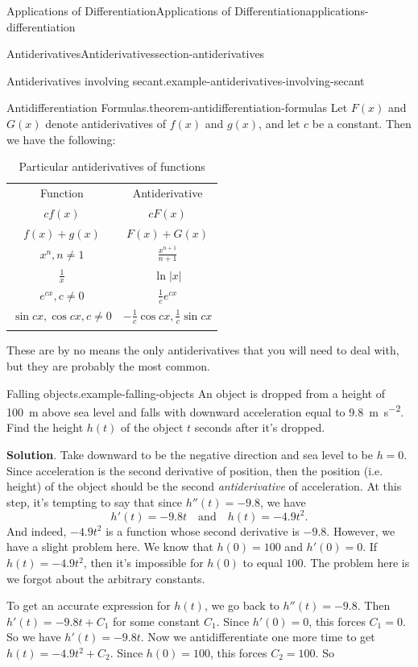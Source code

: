 \documentclass[oneside,10pt,]{book}
\numberwithin{equation}{section}
\newcommand{\hrulethin}  {\noalign{\hrule height 0.04em}}
\newcommand{\hrulethick} {\noalign{\hrule height 0.11em}}
\begin{document}
\begin{chapterptx}{Applications of Differentiation}{}{Applications of Differentiation}{}{}{applications-differentiation}
\begin{sectionptx}{Antiderivatives}{}{Antiderivatives}{}{}{section-antiderivatives}
\begin{example}{Antiderivatives involving secant.}{example-antiderivatives-involving-secant}
\end{example}
\begin{theorem}{Antidifferentiation Formulas.}{}{theorem-antidifferentiation-formulas}%
\hypertarget{p-392}{}%
Let \(F(x)\) and \(G(x)\) denote antiderivatives of \(f(x)\) and \(g(x)\), and let \(c\) be a constant. Then we have the following: \begin{table}
\centering
\begin{tabular}{cc}\hrulethick
Function&Antiderivative\tabularnewline\hrulethin
\(cf(x)\)&\(cF(x)\)\tabularnewline[0pt]
\(f(x) + g(x)\)&\(F(x) + G(x)\)\tabularnewline[0pt]
\(x^{n}, n\neq1\)&\(\frac{x^{n+1}}{n+1}\)\tabularnewline[0pt]
\(\frac{1}{x}\)&\(\ln|x|\)\tabularnewline[0pt]
\(e^{cx}, c\neq0\)&\(\frac{1}{c}e^{cx}\)\tabularnewline[0pt]
\(\sin cx, \cos cx, c\neq 0\)&\(-\frac{1}{c}\cos cx, \frac{1}{c}\sin cx\)\tabularnewline\hrulethick
\end{tabular}
\caption{Particular antiderivatives of functions\label{table-antiderivatives}}
\end{table}
 These are by no means the only antiderivatives that you will need to deal with, but they are probably the most common.%
\end{theorem}
\begin{example}{Falling objects.}{example-falling-objects}%
\hypertarget{p-393}{}%
An object is dropped from a height of \SI{100}{\meter} above sea level and falls with downward acceleration equal to \SI{9.8}{\meter\per\second\tothe{2}}. Find the height \(h(t)\) of the object \(t\) seconds after it's dropped.%
\par\smallskip%
\noindent\textbf{Solution}.\hypertarget{solution-88}{}\quad%
\hypertarget{p-394}{}%
Take downward to be the negative direction and sea level to be \(h=0\). Since acceleration is the second derivative of position, then the position (i.e. height) of the object should be the second \emph{antiderivative} of acceleration. At this step, it's tempting to say that since \(h''(t) = -9.8\), we have%
\begin{equation*}
h'(t) = -9.8t\quad\text{and}\quad h(t) = -4.9 t^{2}\text{.}
\end{equation*}
And indeed, \(-4.9t^{2}\) is a function whose second derivative is \(-9.8\). However, we have a slight problem here. We know that \(h(0) = 100\) and \(h'(0) = 0\). If \(h(t) = -4.9t^{2}\), then it's impossible for \(h(0)\) to equal \(100\). The problem here is we forgot about the arbitrary constants.%
\par
\hypertarget{p-395}{}%
To get an accurate expression for \(h(t)\), we go back to \(h''(t) = -9.8\). Then \(h'(t) = -9.8t+C_{1}\) for some constant \(C_{1}\). Since \(h'(0) = 0\), this forces \(C_{1} = 0\). So we have \(h'(t) = -9.8t\). Now we antidifferentiate one more time to get \(h(t) = -4.9t^{2} + C_{2}\). Since \(h(0) = 100\), this forces \(C_{2} = 100\). So%

\end{example}
\end{sectionptx}
\end{chapterptx}
\end{document}
